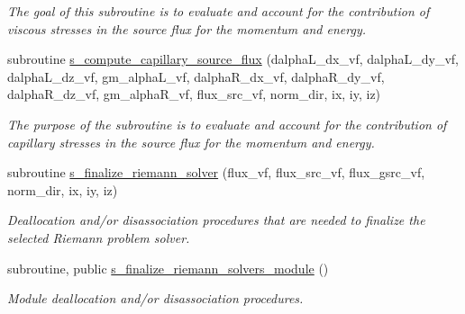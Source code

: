 \begin{DoxyCompactItemize}
\begin{DoxyCompactList}\small\item\em The goal of this subroutine is to evaluate and account for the contribution of viscous stresses in the source flux for the momentum and energy. \end{DoxyCompactList}\item 
subroutine \hyperlink{namespacem__riemann__solvers_aeab4abb9a37e1f537fee511bdcadc9da}{s\+\_\+compute\+\_\+capillary\+\_\+source\+\_\+flux} (dalpha\+L\+\_\+dx\+\_\+vf, dalpha\+L\+\_\+dy\+\_\+vf, dalpha\+L\+\_\+dz\+\_\+vf, gm\+\_\+alpha\+L\+\_\+vf, dalpha\+R\+\_\+dx\+\_\+vf, dalpha\+R\+\_\+dy\+\_\+vf, dalpha\+R\+\_\+dz\+\_\+vf, gm\+\_\+alpha\+R\+\_\+vf, flux\+\_\+src\+\_\+vf, norm\+\_\+dir, ix, iy, iz)
\begin{DoxyCompactList}\small\item\em The purpose of the subroutine is to evaluate and account for the contribution of capillary stresses in the source flux for the momentum and energy. \end{DoxyCompactList}\item 
subroutine \hyperlink{namespacem__riemann__solvers_ab679d890c95c6cb1ee3dc5e5a9ae1c19}{s\+\_\+finalize\+\_\+riemann\+\_\+solver} (flux\+\_\+vf, flux\+\_\+src\+\_\+vf, flux\+\_\+gsrc\+\_\+vf, norm\+\_\+dir, ix, iy, iz)
\begin{DoxyCompactList}\small\item\em Deallocation and/or disassociation procedures that are needed to finalize the selected Riemann problem solver. \end{DoxyCompactList}\item 
subroutine, public \hyperlink{namespacem__riemann__solvers_a5bd1ce6fbbb840b5b1c6dd97ccb8d674}{s\+\_\+finalize\+\_\+riemann\+\_\+solvers\+\_\+module} ()
\begin{DoxyCompactList}\small\item\em Module deallocation and/or disassociation procedures. \end{DoxyCompactList}\end{DoxyCompactItemize}
